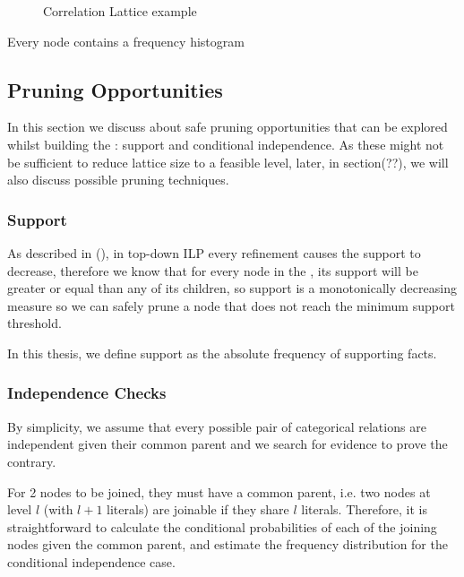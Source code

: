 \begin{figure}[!h]
  \caption{Correlation Lattice example}
  \centering
  \begin{tikzpicture}
  [scale=1.8,auto=center,every node/.style={draw=black, font=\tiny}]
  
  \end{tikzpicture}
  \label{fig:lattice}
\end{figure}

Every node contains a frequency histogram 

\subsection{Pruning Opportunities}

In this section we discuss about safe pruning opportunities that can be explored whilst building the \graphname: support
and conditional independence. As these might not be sufficient to reduce lattice size to a feasible level, later, in
section(??), we will also discuss possible pruning techniques.

\subsubsection{Support}

As described in (\cite{LavracDz94}), in top-down ILP every refinement causes the support to decrease, therefore we know
that for every node in the \graphname, its support will be greater or equal than any of its children, so support is a
monotonically decreasing measure so we can safely prune a node that does not reach the minimum support threshold.

In this thesis, we define support as the absolute frequency of supporting facts.


\subsubsection{Independence Checks}

By simplicity, we assume that every possible pair of categorical relations are independent given their common parent and
we search for evidence to prove the contrary.

For 2 nodes to be joined, they must have a common parent, i.e. two nodes at level $l$ (with $l+1$ literals) are joinable
if they share $l$ literals. Therefore, it is straightforward to calculate the conditional probabilities of each of the
joining nodes given the common parent, and estimate the frequency distribution for the conditional independence case.

